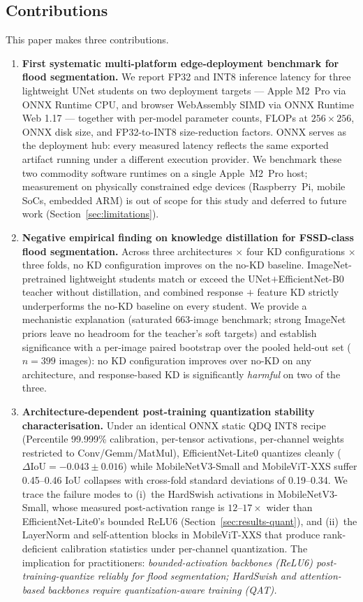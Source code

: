 \subsection{Contributions}
\label{sec:contributions}

This paper makes three contributions.

\begin{enumerate}
\item \textbf{First systematic multi-platform edge-deployment benchmark for flood segmentation.} We report FP32 and INT8 inference latency for three lightweight UNet students on two deployment targets --- Apple M2~Pro via ONNX Runtime CPU, and browser WebAssembly SIMD via ONNX Runtime Web 1.17 --- together with per-model parameter counts, FLOPs at $256{\times}256$, ONNX disk size, and FP32-to-INT8 size-reduction factors. ONNX serves as the deployment hub: every measured latency reflects the same exported artifact running under a different execution provider. We benchmark these two commodity software runtimes on a single Apple~M2~Pro host; measurement on physically constrained edge devices (Raspberry~Pi, mobile SoCs, embedded ARM) is out of scope for this study and deferred to future work (Section~\ref{sec:limitations}).

\item \textbf{Negative empirical finding on knowledge distillation for FSSD-class flood segmentation.} Across three architectures $\times$ four KD configurations $\times$ three folds, no KD configuration improves on the no-KD baseline. ImageNet-pretrained lightweight students match or exceed the UNet$+$EfficientNet-B0 teacher without distillation, and combined response $+$ feature KD strictly underperforms the no-KD baseline on every student. We provide a mechanistic explanation (saturated 663-image benchmark; strong ImageNet priors leave no headroom for the teacher's soft targets) and establish significance with a per-image paired bootstrap over the pooled held-out set ($n=399$ images): no KD configuration improves over no-KD on any architecture, and response-based KD is significantly \emph{harmful} on two of the three.

\item \textbf{Architecture-dependent post-training quantization stability characterisation.} Under an identical ONNX static QDQ INT8 recipe (Percentile 99.999\% calibration, per-tensor activations, per-channel weights restricted to Conv/Gemm/MatMul), EfficientNet-Lite0 quantizes cleanly ($\Delta \mathrm{IoU} = -0.043 \pm 0.016$) while MobileNetV3-Small and MobileViT-XXS suffer 0.45--0.46 IoU collapses with cross-fold standard deviations of 0.19--0.34. We trace the failure modes to (i)~the HardSwish activations in MobileNetV3-Small, whose measured post-activation range is $12$--$17\times$ wider than EfficientNet-Lite0's bounded ReLU6 (Section~\ref{sec:results-quant}), and (ii)~the LayerNorm and self-attention blocks in MobileViT-XXS that produce rank-deficient calibration statistics under per-channel quantization. The implication for practitioners: \emph{bounded-activation backbones (ReLU6) post-training-quantize reliably for flood segmentation; HardSwish and attention-based backbones require quantization-aware training (QAT).}
\end{enumerate}

